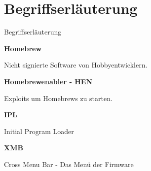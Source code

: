 \documentclass[mode=print,paper=screen,size=10pt,style=paintings]{powerdot}
\begin{document}
\section{Begriffserläuterung}
\begin{slide}{Begriffserläuterung}
	\begin{large}\textbf{Homebrew}\end{large}\linebreak
	Nicht signierte Software von Hobbyentwicklern.\linebreak
	\linebreak
	\begin{large}\textbf{Homebrewenabler - HEN}\end{large}\linebreak
	Exploits um Homebrews zu starten.\linebreak
	\linebreak
	\begin{large}\textbf{IPL}\end{large}\linebreak
	Initial Program Loader\linebreak
	\linebreak
	\begin{large}\textbf{XMB}\end{large}\linebreak
	Cross Menu Bar - Das Menü der Firmware
\end{slide}



\end{document}
